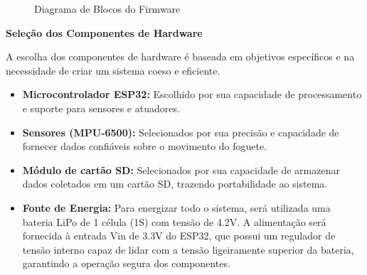 \begin{figure}[h!]
    \centering
    \caption{Diagrama de Blocos do Firmware}
    \label{fig:firmware_diagram}
\end{figure}


\textbf{Seleção dos Componentes de Hardware}

A escolha dos componentes de hardware é baseada em objetivos específicos e na necessidade de criar um sistema coeso e eficiente.

\begin{itemize}
    \item   \textbf{Microcontrolador ESP32:} Escolhido por sua capacidade de processamento e suporte para sensores e atuadores.
    \item   \textbf{Sensores (MPU-6500):} Selecionados por sua precisão e capacidade de fornecer dados confiáveis sobre o movimento do foguete.
    \item   \textbf{Módulo de cartão SD:} Selecionados por sua capacidade de armazenar dados coletados em um cartão SD, trazendo portabilidade ao sistema.
    \item   \textbf{Fonte de Energia:} Para energizar todo o sistema, será utilizada uma bateria LiPo de 1 célula (1S) com tensão de 4.2V. A alimentação será fornecida à entrada Vin de 3.3V do ESP32, que possui um regulador de tensão interno capaz de lidar com a tensão ligeiramente superior da bateria, garantindo a operação segura dos componentes.
\end{itemize}


